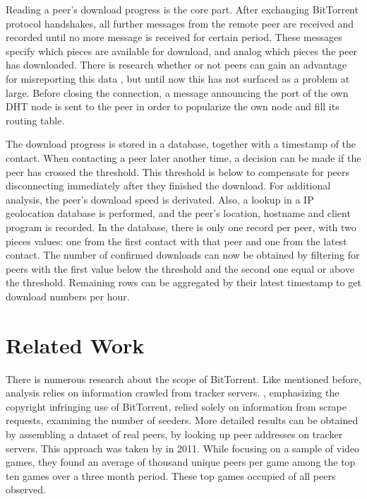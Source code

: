 \documentclass[10pt, a4paper, twoside=false, headsepline]{scrbook}
\renewcommand{\_}{\origunderscore\allowbreak}
\begin{document}
Reading a peer's download progress is the core part. After exchanging BitTorrent protocol handshakes, all further messages from the remote peer are received and recorded until no more message is received for certain period. These messages specify which pieces are available for download, and analog which pieces the peer has downloaded. There is research whether or not peers can gain an advantage for misreporting this data \cite{levin2008bittorrent}, but until now this has not surfaced as a problem at large. Before closing the connection, a message announcing the port of the own DHT node is sent to the peer in order to popularize the own node and fill its routing table.

The download progress is stored in a database, together with a timestamp of the contact. When contacting a peer later another time, a decision can be made if the peer has crossed the threshold. This threshold is below  to compensate for peers disconnecting immediately after they finished the download. For additional analysis, the peer's download speed is derivated. Also, a lookup in a IP geolocation database is performed, and the peer's location, hostname and client program is recorded. In the database, there is only one record per peer, with two pieces values: one from the first contact with that peer and one from the latest contact. The number of confirmed downloads can now be obtained by filtering for peers with the first value below the threshold and the second one equal or above the threshold. Remaining rows can be aggregated by their latest timestamp to get download numbers per hour.

\section{Related Work}
There is numerous research about the scope of BitTorrent. Like mentioned before, analysis relies on information crawled from tracker servers. \textcite{watters2011much}, emphasizing the copyright infringing use of BitTorrent, relied solely on information from scrape requests, examining the number of seeders. More detailed results can be obtained by assembling a dataset of real peers, by looking up peer addresses on tracker servers. This approach was taken by \textcite{drachen2011distribution} in 2011. While focusing on a sample of  video games, they found an average of  thousand unique peers per game among the top ten games over a three month period. These top  games occupied  of all peers observed.
\end{document}
